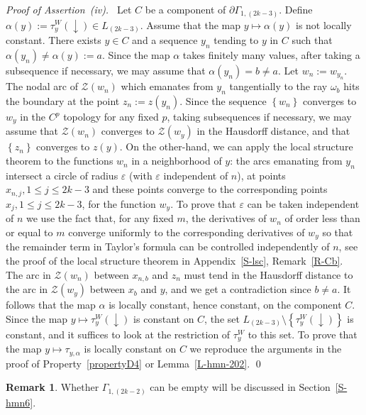 \documentclass[12pt,a4paper]{amsart}
\theoremstyle{plain} %
\theoremstyle{definition}
\newtheorem{remark}[theorem]{Remark}
\numberwithin{equation}{section}
\numberwithin{figure}{section}
\numberwithin{table}{section}
\newcommand{\cZ}{\mathcal{Z}}
\newcommand{\sm}{\!\setminus\!}
\newcommand{\set}[1]{\left\lbrace #1 \right\rbrace}
\begin{document}
\emph{Proof of Assertion~(iv).~} Let $C$ be a component of $\partial \Gamma_{1,(2k-3)}$.  Define $\alpha(y) := \tau_{y}^{W}(\downarrow) \in L_{(2k-3)}$.  Assume that the map $y \mapsto \alpha(y)$ is not locally constant. There exists $y \in C$ and a sequence $y_n$ tending to $y$ in $C$ such that $\alpha(y_n) \neq \alpha(y):=a$. Since the map $\alpha$ takes finitely many values, after taking a subsequence if necessary, we may assume that $\alpha(y_n) = b \neq a$. Let $w_n := w_{y_n}$. The nodal arc of $\cZ(w_n)$ which emanates from $y_n$ tangentially to the ray $\omega_b$ hits the boundary at the point $z_n := z(y_n)$. Since the sequence $\set{w_n}$ converges to $w_y$ in the $C^p$ topology for any fixed $p$, taking subsequences if necessary, we may assume that $\cZ(w_n)$ converges to $\cZ(w_y)$ in the Hausdorff distance, and that $\set{z_n}$ converges to $z(y)$. On the other-hand, we can apply the local structure theorem to the functions $w_n$ in a neighborhood of $y$: the arcs emanating from $y_n$ intersect a circle of radius $\varepsilon$
 (with $\varepsilon$ independent of $n$), at points $x_{n,j}, 1 \le j \le 2k -3$ and these points converge to the corresponding points $x_j, 1 \le j \le 2k -3$, for the function $w_y$.
  To prove that $\varepsilon$ can be taken independent of $n$ we use the fact that, for any fixed $m$, the derivatives of $w_n$ of order less than or equal to $m$ converge uniformly to the corresponding derivatives of $w_y$ so that the remainder term in Taylor's formula can be controlled independently of $n$, see the proof of the local structure theorem in  Appendix~\ref{S-lsc}, Remark~\ref{R-Cb}. The arc in $\cZ(w_n)$ between $x_{n,b}$ and $z_n$ must tend in the Hausdorff distance to the arc in $\cZ(w_y)$ between $x_b$ and $y$, and we get a contradiction since $b\neq a$. It follows that the map $\alpha$ is locally constant, hence constant, on the component $C$.  Since the map $y \mapsto \tau_{y}^{W}(\downarrow)$ is constant on $C$, the set $L_{(2k-3)} \sm \set{\tau_{y}^{W}(\downarrow)}$ is constant, and it suffices to look at the restriction of $\tau_{y}^{W}$ to this set. To prove that the map $y \mapsto \tau_{y,\alpha}$ is locally constant on $C$ we reproduce the arguments in the proof of  Property~\ref{propertyD4} or Lemma~\ref{L-hmn-202}. \hfill \qed


\begin{remark}\label{R-L33r}
Whether  $\Gamma_{1,(2k-2)}$ can be empty will be discussed in Section~\ref{S-hmn6}.
\end{remark}%
\end{document}
